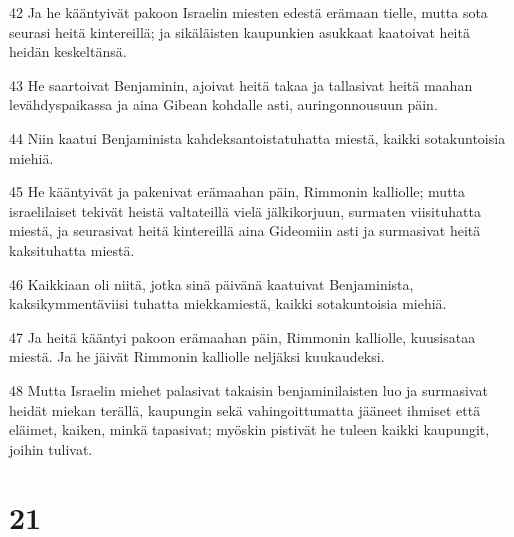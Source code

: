 \par 42 Ja he kääntyivät pakoon Israelin miesten edestä erämaan tielle, mutta sota seurasi heitä kintereillä; ja sikäläisten kaupunkien asukkaat kaatoivat heitä heidän keskeltänsä.
\par 43 He saartoivat Benjaminin, ajoivat heitä takaa ja tallasivat heitä maahan levähdyspaikassa ja aina Gibean kohdalle asti, auringonnousuun päin.
\par 44 Niin kaatui Benjaminista kahdeksantoistatuhatta miestä, kaikki sotakuntoisia miehiä.
\par 45 He kääntyivät ja pakenivat erämaahan päin, Rimmonin kalliolle; mutta israelilaiset tekivät heistä valtateillä vielä jälkikorjuun, surmaten viisituhatta miestä, ja seurasivat heitä kintereillä aina Gideomiin asti ja surmasivat heitä kaksituhatta miestä.
\par 46 Kaikkiaan oli niitä, jotka sinä päivänä kaatuivat Benjaminista, kaksikymmentäviisi tuhatta miekkamiestä, kaikki sotakuntoisia miehiä.
\par 47 Ja heitä kääntyi pakoon erämaahan päin, Rimmonin kalliolle, kuusisataa miestä. Ja he jäivät Rimmonin kalliolle neljäksi kuukaudeksi.
\par 48 Mutta Israelin miehet palasivat takaisin benjaminilaisten luo ja surmasivat heidät miekan terällä, kaupungin sekä vahingoittumatta jääneet ihmiset että eläimet, kaiken, minkä tapasivat; myöskin pistivät he tuleen kaikki kaupungit, joihin tulivat.

\chapter{21}


